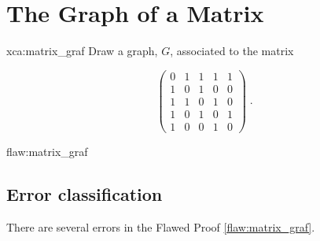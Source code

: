 \section{The Graph of a Matrix}

\begin{xca}{xca:matrix_graf}
Draw a graph, $G$, associated to the matrix

$$\begin{pmatrix}
0 & 1 & 1 & 1 & 1 \\
1 & 0 & 1 & 0 & 0 \\
1 & 1 & 0 & 1 & 0 \\
1 & 0 & 1 & 0 & 1 \\
1 & 0 & 0 & 1 & 0
\end{pmatrix}\;.$$
\end{xca}

\begin{flaw}{flaw:matrix_graf} %
\end{flaw}

\clearpage
\subsection{Error classification}


There are several errors
 in the Flawed Proof \ref{flaw:matrix_graf}. %

